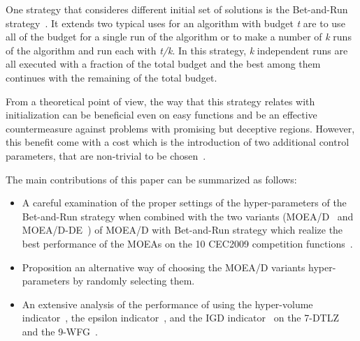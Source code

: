 One strategy that consideres different initial set of solutions is the Bet-and-Run strategy~\cite{fischetti2014exploiting}. It extends two typical uses for an algorithm with budget \textit{t} are to use all of the budget for a single run of the algorithm or to make a number of \textit{k} runs of the algorithm and run each with \textit{t/k}. In this strategy, \textit{k} independent runs are all executed with a fraction of the total budget and the best among them continues with the remaining of the total budget.
 
From a theoretical point of view, the way that this strategy relates with initialization can be beneficial even on easy functions and be an effective countermeasure against problems with promising but deceptive regions. However, this benefit come with a cost which is the introduction of two additional control parameters, that are non-trivial to be chosen~\cite{lissovoi2017theoretical}.

The main contributions of this paper can be summarized as follows:

\begin{itemize}
	\item A careful examination of the proper settings of the hyper-parameters of the Bet-and-Run strategy when combined with the two variants (MOEA/D~\cite{zhang2007moea} and MOEA/D-DE~\cite{li2009multiobjective}) of MOEA/D with Bet-and-Run strategy which realize the best performance of the MOEAs on the 10 CEC2009 competition functions~\cite{zhang2008multiobjective}.
	\item Proposition an alternative way of choosing the MOEA/D variants hyper-parameters by randomly selecting them.		
	\item An extensive analysis of the performance of using the hyper-volume indicator~\cite{zitzler1998multiobjective}, the epsilon indicator~\cite{zitzler2003performance}, and the IGD indicator~\cite{zitzler2003performance} on the 7-DTLZ~\cite{deb2005scalable} and the 9-WFG~\cite{huband2006review}. 
\end{itemize}


 
 